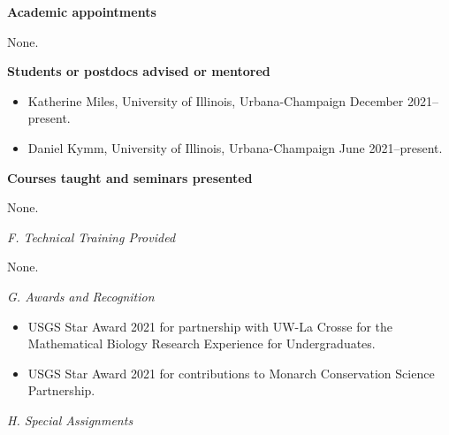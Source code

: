 \documentclass[12pt]{article}
\begin{document}
\vspace{10pt}
\raggedright \textbf{Academic appointments} \\
\vspace{10pt}

None.

\vspace{10pt}
\raggedright \textbf{Students or postdocs advised or mentored} \\
\vspace{10pt}

\begin{itemize}
\item Katherine Miles,
  University of Illinois, Urbana-Champaign
  December 2021--present.
\item Daniel Kymm,
  University of Illinois, Urbana-Champaign
  June 2021--present.
\end{itemize}

\vspace{10pt}
\raggedright \textbf{Courses taught and seminars presented} \\
\vspace{10pt}

None.


\vspace{10pt}
\raggedright \large \textit{F. Technical Training Provided} \\
\normalsize
\vspace{10pt}

None.

\vspace{10pt}
\raggedright \large \textit{G. Awards and Recognition} \\
\normalsize
\vspace{10pt}



\begin{itemize}
\item USGS Star Award 2021 for partnership with UW-La Crosse for the
  Mathematical Biology Research Experience for
  Undergraduates. \label{USGSstar2021}
  \item USGS Star Award 2021 for contributions to Monarch Conservation
    Science Partnership. \label{USGSstar2021b}
\end{itemize}





\vspace{10pt}
\raggedright \large \textit{H. Special Assignments} \\
\normalsize
\vspace{10pt}
\end{document}
